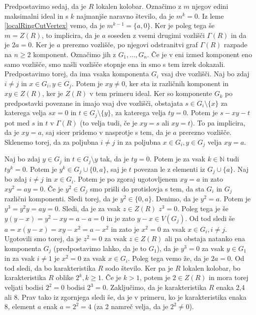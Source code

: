 \documentclass[a4paper, 12pt]{amsart}
\theoremstyle{definition} %
\theoremstyle{plain} %
\newcommand{\N}{\mathbb N}
\begin{document}
Predpostavimo sedaj, da je $R$ lokalen kolobar. Označimo z $m$ njegov edini maksimalni ideal in s $k$ najmanjše naravno število, da je $m^k = 0$. Iz leme \ref{localRingCutVertex} vemo, da je $m^{k-1} =  \{a,0\}$. Ker je poleg tega še $m = Z(R)$, to implicira, da je $a$ soseden z vsemi drugimi vozlišči $\Gamma(R)$ in da je $2a = 0$. Ker je $a$ prerezno vozlišče, po njegovi odstranitvi graf $\Gamma(R)$ razpade na $n\ge 2$ komponent. Označimo jih z $G_1,\dots, G_n$. Če je v eni izmed komponent eno samo vozlišče, smo našli vozlišče stopnje ena in smo s tem izrek dokazali. Predpostavimo torej, da ima vsaka komponenta $G_i$ vsaj dve vozlišči. Naj bo zdaj $i\neq j$ in $x\in G_i, y\in G_j$. Potem je $xy \neq 0$, ker sta iz različnih komponent in $xy \in Z(R)$, ker je $Z(R)$ v tem primeru ideal. Ker so komponente $G_k$ po predpostavki povezane in imajo vsaj dve vozlišči, obstajata $s\in G_i\setminus\{x\}$  za katerega velja $sx = 0$ in $t\in G_j \setminus \{y\}$, za katerega velja $ty = 0$. Potem je $s-xy -t$ pot med $s$ in $t$ v $\Gamma(R)$ (to velja tudi, če je $xy = s$ ali $xy = t$). To pa implicira, da je $xy = a$, saj sicer pridemo v nasprotje s tem, da je $a$ prerezno vozlišče. Sklenemo torej, da za poljubna $i\neq j$ in za poljubna $x\in G_i, y\in G_j$ velja $xy = a$.

Naj bo zdaj $y\in G_j$ in $t\in G_j\setminus{y}$ tak, da je $ty=0$. Potem je za vsak $k\in \N$ tudi $ty^k = 0$. Potem je $y^k \in G_j \cup\{0,a\}$, saj je $t$ povezan le z elementi iz $G_j \cup \{a\}$. Naj bo zdaj $i \neq j  $ in $x\in G_i$. Potem je po zgoraj ugotovljenem $xy=a$ in zato $xy^2 = ay = 0$. Če je $y^2 \in G_j$ smo prišli do protislovja s tem, da sta $G_i $ in $G_j$ različni komponenti. Sledi torej, da je $y^2  \in \{0,a\}$. Denimo, da je $y^2 = a$. Potem je $y^3 = y^2 y = ay = 0$. Sledi, da je za vsak $z\in Z(R)$ $z^3 = 0$. Poleg tega je še $y(y-x) = y^2 - xy = a -a = 0$ in je zato $y-x \in V(G_j)$. Od tod sledi še $a = x(y-x) = xy - x^2 = a - x^2$ in zato je $x^2 = 0$ za vsak $x\in G_i, i\neq j$. Ugotovili smo torej, da je $z^2 = 0$ za vsak $z\in Z(R)$ ali pa obstaja natanko ena komponenta $G_j$ (predpostavimo lahko, da je to $G_1$), da je $y^3 = 0$ za vsak $y\in G_1$ in za vsak $i\neq 1$ je $x^2 = 0$ za vsak $x\in G_i$. Poleg tega vemo že, da je $2a = 0$. Od tod sledi, da bo karakteristika $R$ sodo število. Ker pa je $R$ lokalen kolobar, bo karakteristika  $R$ oblike $2^k, k \ge 1$. Če je $k > 1$, potem je $2\in Z(R)$ in mora torej veljati bodisi $2^2 = 0$ bodisi $2^3 = 0$. Zaključimo, da je karakteristika $R$ enaka 2,4 ali 8. Prav tako iz zgornjega sledi še, da je v primeru, ko je karakteristika enaka 8, element $a$ enak $a = 2^2 = 4$ (za 2 namreč velja, da je $2^2 \neq 0$).
\end{document}
